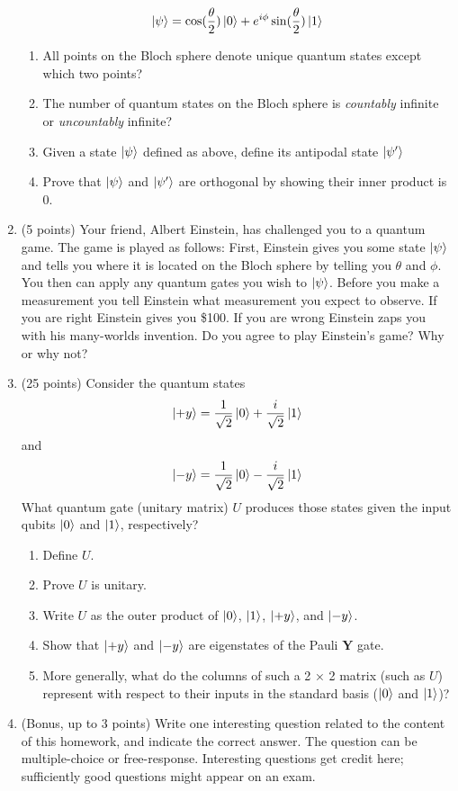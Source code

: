 \documentclass[12pt]{article}
\begin{document}
\begin{enumerate}[font=\bfseries]
    \[\ket{\psi} = \cos(\frac{\theta}{2})\ket{0}
    + e^{i\phi}\sin(\frac{\theta}{2})\ket{1}\]
    \begin{enumerate}
        \item All points on the Bloch sphere denote unique quantum states except which two points?
        \item The number of quantum states on the Bloch sphere is \emph{countably} infinite or \emph{uncountably} infinite?
        \item Given a state $\ket{\psi}$ defined as above, define its antipodal state $\ket{\psi'}$
        \item Prove that $\ket{\psi}$ and $\ket{\psi'}$ are orthogonal by showing their inner product is 0.
    \end{enumerate}
    \item (5 points) Your friend, Albert Einstein, has challenged you to a quantum game. The game is played as follows: First, Einstein gives you some state $\ket{\psi}$ and tells you where it is located on the Bloch sphere by telling you $\theta$ and $\phi$. You then can apply any quantum gates you wish to $\ket{\psi}$. Before you make a measurement you tell Einstein what measurement you expect to observe. If you are right Einstein gives you \$100. If you are wrong Einstein zaps you with his many-worlds invention. Do you agree to play Einstein's game? Why or why not?
    \item (25 points) Consider the quantum states
        \[\ket{+y} = \frac{1}{\sqrt{2}}\ket{0} + \frac{i}{\sqrt{2}}\ket{1}\]
        and
        \[\ket{-y} = \frac{1}{\sqrt{2}}\ket{0} - \frac{i}{\sqrt{2}}\ket{1}\]
        What quantum gate (unitary matrix) $U$ produces those states given the input qubits $\ket{0}$ and $\ket{1}$, respectively?
        \begin{enumerate}
            \item Define $U$.
            \item Prove $U$ is unitary.
            \item Write $U$ as the outer product of $\ket{0}$, $\ket{1}$, $\ket{+y}$, and $\ket{-y}$.
            \item Show that $\ket{+y}$ and $\ket{-y}$ are eigenstates of the Pauli $\mathbf{Y}$ gate.
            \item More generally, what do the columns of such a 2 × 2 matrix (such as $U$) represent with respect to their inputs in the standard basis ($\ket{0}$ and $\ket{1}$)?
        \end{enumerate}
    \item (Bonus, up to 3 points) Write one interesting question related to the content of this homework, and indicate the correct answer. The question can be multiple-choice or free-response.  Interesting questions get credit here;  sufficiently good questions might appear on an exam.
\end{enumerate}
\end{document}
